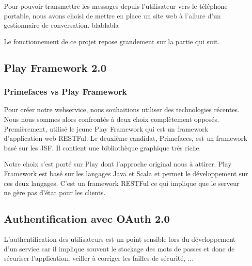 Pour pouvoir transmettre les messages depuis l'utilisateur vers le téléphone portable, nous avons
choisi de mettre en place un site web à l'allure d'un gestionnaire de conversation. 
blablabla

Le fonctionnement de ce projet repose grandement sur la partie qui suit.



\subsection{Play Framework 2.0}

\subsubsection{Primefaces vs Play Framework}

Pour créer notre webservice, nous souhaitions utiliser des technologies récentes. Nous nous sommes
alors confrontés à deux choix complètement opposés. Premièrement, utilisé le jeune Play Framework 
qui est un framework d'application web RESTFul. Le deuxième candidat, Primefaces, est un framework
basé sur les JSF. Il contient une bibliothèque graphique très riche.

Notre choix s'est porté sur Play dont l'approche original nous à attirer. Play Framework est basé sur
les langages Java et Scala et permet le développement sur ces deux langages. C'est un framework RESTFul
ce qui implique que le serveur ne gère pas d'état pour les clients.


\subsection{Authentification avec OAuth 2.0} %

L'authentification des utilisateurs est un point sensible lors du développement d'un service car il
implique souvent le stockage des mots de passes et donc de sécuriser l'application, veiller à corriger
les failles de sécurité, ... 


